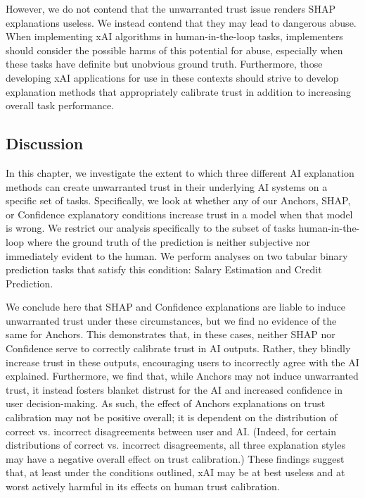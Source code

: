 However, we do not contend that the unwarranted trust issue renders SHAP explanations useless. We instead contend that they may lead to dangerous abuse. When implementing xAI algorithms in human-in-the-loop tasks, implementers should consider the possible harms of this potential for abuse, especially when these tasks have definite but unobvious ground truth. Furthermore, those developing xAI applications for use in these contexts should strive to develop explanation methods that appropriately calibrate trust in addition to increasing overall task performance.

\subsection{Discussion}
In this chapter, we investigate the extent to which three different AI explanation methods can create unwarranted trust in their underlying AI systems on a specific set of tasks. Specifically, we look at whether any of our Anchors, SHAP, or Confidence explanatory conditions increase trust in a model when that model is wrong. We restrict our analysis specifically to the subset of tasks human-in-the-loop where the ground truth of the prediction is neither subjective nor immediately evident to the human. We perform analyses on two tabular binary prediction tasks that satisfy this condition: Salary Estimation and Credit Prediction.

We conclude here that SHAP and Confidence explanations are liable to induce unwarranted trust under these circumstances, but we find no evidence of the same for Anchors. This demonstrates that, in these cases, neither SHAP nor Confidence serve to correctly calibrate trust in AI outputs. Rather, they blindly increase trust in these outputs, encouraging users to incorrectly agree with the AI explained. Furthermore, we find that, while Anchors may not induce unwarranted trust, it instead fosters blanket distrust for the AI and increased confidence in user decision-making. As such, the effect of Anchors explanations on trust calibration may not be positive overall; it is dependent on the distribution of correct vs. incorrect disagreements between user and AI. (Indeed, for certain distributions of correct vs. incorrect disagreements, all three explanation styles may have a negative overall effect on trust calibration.) These findings suggest that, at least under the conditions outlined, xAI may be at best useless and at worst actively harmful in its effects on human trust calibration. 

